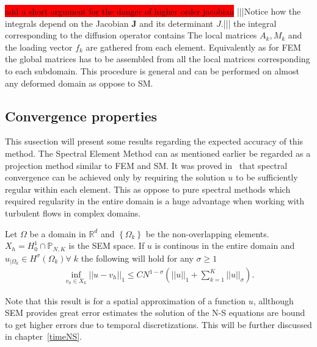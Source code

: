 %
\colorbox{red}{add a short argument for the danger of higher order jacobian}
|||Notice how the integrals depend on the Jacobian $\mathbf{J}$ and its determinant $J$.|||
the integral corresponding to the diffusion operator contains 
The local matrices $A_k,M_k$ and the loading vector $f_k$ are gathered from each element.
Equivalently as for FEM the global matrices has to be assembled
from all the local matrices corresponding to each subdomain. This procedure is general and can 
be performed on almost any deformed domain as oppose to SM. 


\subsection{Convergence properties}
This susection will present some results regarding the expected accuracy of this method.
The Spectral Element Method can as mentioned earlier be regarded as a projection 
method similar to FEM and SM. 
It was proved in~\cite{MPR1987} that spectral convergence can be achieved only by requiring the solution
$u$ to be sufficiently regular within each element. This as oppose to pure spectral methods which
required regularity in the entire domain is a huge advantage when working with turbulent flows 
in complex domains. 
\begin{theorem}
    Let $\Omega$ be a domain in $\mathbb{R}^d$ and $\left\{ \Omega_k \right\}$ 
    be the non-overlapping elements. $X_h = H^1_0\cap\mathbb{P}_{N,K}$ is the SEM space. If $u$ is continous in the entire domain 
    and $u_{|\Omega_k} \in H^{\sigma}(\Omega_k) \forall \; k $ the following will hold for 
    any $\sigma \ge 1$
\begin{align}
    \inf_{v_{h}\in X_{k}}||u-v_h||_1 \le CN^{1-\sigma}\left( ||u||_1 + \sum_{k=1}^{K}||u||_{\sigma} \right).
\end{align}
    \label{thm:semconvergence}
\end{theorem}
%
Note that this result is for a spatial approximation of a function $u$, allthough SEM provides 
great error estimates the solution of the N-S equations are bound to get higher errors due to 
temporal discretizations. This will be further discussed in chapter~\ref{timeNS}.
